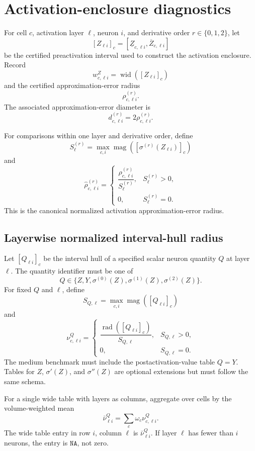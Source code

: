 \documentclass[11pt]{article}
\newcommand{\rad}{\operatorname{rad}}
\newcommand{\wid}{\operatorname{wid}}
\newcommand{\magI}{\operatorname{mag}}
\newcommand{\NA}{\texttt{NA}}
\begin{document}
\section{Activation-enclosure diagnostics}

For cell \(c\), activation layer \(\ell\), neuron \(i\), and derivative order
\(r\in\{0,1,2\}\), let
\[
 [Z_{\ell i}]_c
 =[\underline Z_{c,\ell i},\overline Z_{c,\ell i}]
\]
be the certified preactivation interval used to construct the activation
enclosure.  Record
\[
 w^Z_{c,\ell i}=\wid([Z_{\ell i}]_c)
\]
and the certified approximation-error radius
\[
 \rho_{c,\ell i}^{(r)}.
\]
The associated approximation-error diameter is
\[
 d_{c,\ell i}^{(r)}=2\rho_{c,\ell i}^{(r)}.
\]

For comparisons within one layer and derivative order, define
\[
 S_\ell^{(r)}
 =\max_{c,i}\magI\left([\sigma^{(r)}(Z_{\ell i})]_c\right)
\]
and
\[
 \widehat\rho_{c,\ell i}^{(r)}
 =\begin{cases}
  \dfrac{\rho_{c,\ell i}^{(r)}}{S_\ell^{(r)}},
  &S_\ell^{(r)}>0,\\[2mm]
  0,&S_\ell^{(r)}=0.
 \end{cases}
\]
This is the canonical normalized activation approximation-error radius.

\subsection{Layerwise normalized interval-hull radius}

Let \([Q_{\ell i}]_c\) be the interval hull of a specified scalar neuron
quantity \(Q\) at layer \(\ell\).  The quantity identifier must be one of
\[
 Q\in\{Z,Y,\sigma^{(0)}(Z),\sigma^{(1)}(Z),\sigma^{(2)}(Z)\}.
\]
For fixed \(Q\) and \(\ell\), define
\[
 S_{Q,\ell}=\max_{c,i}\magI([Q_{\ell i}]_c)
\]
and
\[
 \nu_{c,\ell i}^{Q}
 =\begin{cases}
 \dfrac{\rad([Q_{\ell i}]_c)}{S_{Q,\ell}},&S_{Q,\ell}>0,\\[2mm]
 0,&S_{Q,\ell}=0.
 \end{cases}
\]
The medium benchmark must include the postactivation-value table
\(Q=Y\).  Tables for \(Z\), \(\sigma'(Z)\), and \(\sigma''(Z)\) are optional
extensions but must follow the same schema.

For a single wide table with layers as columns, aggregate over cells by the
volume-weighted mean
\[
 \bar\nu_{\ell i}^{Q}=\sum_c\omega_c\nu_{c,\ell i}^{Q}.
\]
The wide table entry in row \(i\), column \(\ell\) is
\(\bar\nu_{\ell i}^{Q}\).  If layer \(\ell\) has fewer than \(i\) neurons,
the entry is \(\NA\), not zero.
\end{document}
